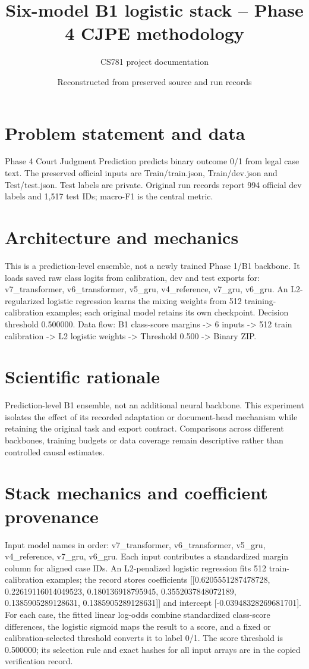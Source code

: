 \documentclass[11pt,a4paper]{article}
\begin{document}
\title{Six-model B1 logistic stack -- Phase 4 CJPE methodology}
\author{CS781 project documentation}
\date{Reconstructed from preserved source and run records}
\maketitle
\section{Problem statement and data}
Phase 4 Court Judgment Prediction predicts binary outcome 0/1 from legal case text. The preserved official inputs are Train/train.json, Train/dev.json and Test/test.json. Test labels are private. Original run records report 994 official dev labels and 1,517 test IDs; macro-F1 is the central metric.
\section{Architecture and mechanics}
This is a prediction-level ensemble, not a newly trained Phase 1/B1 backbone. It loads saved raw class logits from calibration, dev and test exports for: v7\_transformer, v6\_transformer, v5\_gru, v4\_reference, v7\_gru, v6\_gru. An L2-regularized logistic regression learns the mixing weights from 512 training-calibration examples; each original model retains its own checkpoint. Decision threshold 0.500000. Data flow: B1 class-score margins -> 6 inputs -> 512 train calibration -> L2 logistic weights -> Threshold 0.500 -> Binary ZIP.
\section{Scientific rationale}
Prediction-level B1 ensemble, not an additional neural backbone. This experiment isolates the effect of its recorded adaptation or document-head mechanism while retaining the original task and export contract. Comparisons across different backbones, training budgets or data coverage remain descriptive rather than controlled causal estimates.
\section{Stack mechanics and coefficient provenance}
Input model names in order: v7\_transformer, v6\_transformer, v5\_gru, v4\_reference, v7\_gru, v6\_gru. Each input contributes a standardized margin column for aligned case IDs. An L2-penalized logistic regression fits 512 train-calibration examples; the record stores coefficients [[0.6205551287478728, 0.22619116014049523, 0.180136918795945, 0.3552037848072189, 0.1385905289128631, 0.1385905289128631]] and intercept [-0.03948328269681701]. For each case, the fitted linear log-odds combine standardized class-score differences, the logistic sigmoid maps the result to a score, and a fixed or calibration-selected threshold converts it to label 0/1. The score threshold is 0.500000; its selection rule and exact hashes for all input arrays are in the copied verification record.
\end{document}
